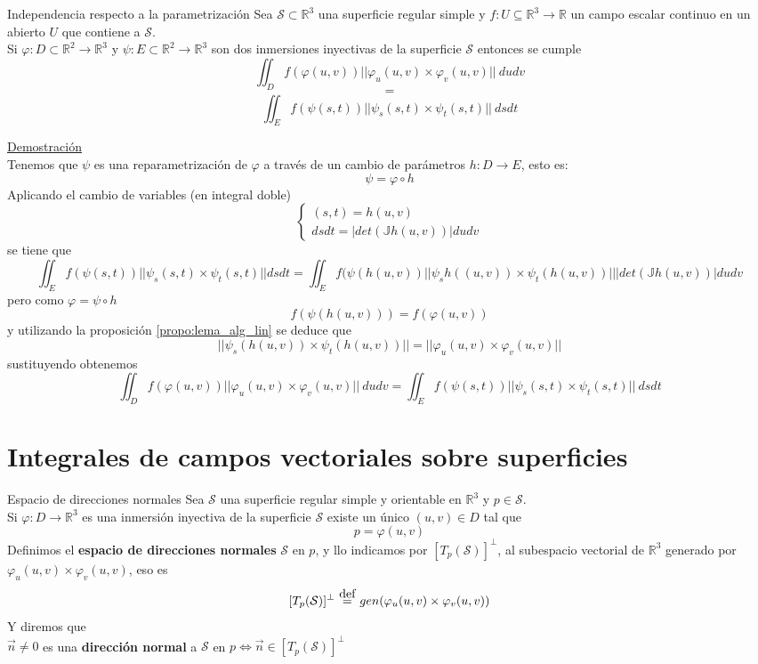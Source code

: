 \documentclass{report}
\newcommand\defeq{\stackrel{\mathclap{\normalfont\mbox{def}}}{~=~}}
\newcommand\reals{\mathds{R}}
\begin{document}
\begin{teobox}{Independencia respecto a la parametrización}
	Sea $\mathcal{S} \subset \reals^3$ una superficie regular simple y $f: U \subseteq \reals^3 \rightarrow \reals$ un campo escalar continuo en un abierto $U$ que contiene a $\mathcal{S}$. \\
	Si $\varphi : D \subset \reals^2 \rightarrow \reals^3$ y $\psi : E \subset \reals^2 \rightarrow \reals^3$ son dos inmersiones inyectivas de la superficie $\mathcal{S}$ entonces se cumple \\
	\[
		\iint_D{f(\varphi (u,v) ) ||\varphi_u (u,v) \times \varphi_v (u,v)||~dudv}
	\]
	\[ = \]
	\[
		\iint_E{f(\psi (s,t) ) ||\psi_s (s,t) \times \psi_t (s,t)||~dsdt}
	\]
\end{teobox}
\underline{Demostración} \\
Tenemos que $\psi$ es una reparametrización de $\varphi$ a través de un cambio de parámetros $h: D \rightarrow E$, esto es:
\[
	\psi = \varphi \circ h
\]
Aplicando el cambio de variables (en integral doble)
\[
	\left\{\begin{array}{l}
		(s,t) = h(u,v) \\
		dsdt = |det(\mathds{J}h(u,v))|dudv
	\end{array}\right.
\]
se tiene que \\
\[
	\iint_E{f(\psi (s,t) ) ||\psi_s (s,t) \times \psi_t (s,t)|| dsdt} =
	\iint_E{f(\psi (h(u,v)) ||\psi_s h((u,v)) \times \psi_t (h(u,v))|||det(\mathds{J}h(u,v))| dudv}
\]
pero como $\varphi = \psi \circ h$
\[
	f(\psi (h (u,v) ) ) = f(\varphi (u,v) )
\]
y utilizando la proposición \ref{propo:lema_alg_lin} se deduce que
\[
	||\psi_s (h(u,v)) \times \psi_t (h(u,v))|| = ||\varphi_u (u,v) \times \varphi_v (u,v)||
\]
sustituyendo obtenemos
\[
	\iint_D{f(\varphi (u,v) ) ||\varphi_u (u,v) \times \varphi_v (u,v)||~dudv} =
	\iint_E{f(\psi (s,t) ) ||\psi_s (s,t) \times \psi_t (s,t)||~dsdt}
\]
\section{Integrales de campos vectoriales sobre superficies}

\begin{defbox}{Espacio de direcciones normales}
	Sea $\mathcal{S}$ una superficie regular simple y orientable en $\reals^3$ y $p \in \mathcal{S}$.\\
	Si $\varphi : D \rightarrow \reals^3$ es una inmersión inyectiva de la superficie $\mathcal{S}$ existe un único $(u,v)\in D$ tal que
	\[
		p=\varphi (u,v)
	\]
	Definimos el \textbf{espacio de direcciones normales} $\mathcal{S}$ en $p$, y llo indicamos por $[T_p(\mathcal{S})]^\bot$, al subespacio vectorial de $\reals^3$ generado por $\varphi_u (u,v) \times \varphi_v (u,v)$, eso es
	\[
		[T_p(\mathcal{S})]^\bot \defeq gen(\varphi_u (u,v) \times \varphi_v (u,v))
	\]
	Y diremos que \\
	$\vec{n} \ne 0$ es una \textbf{dirección normal} a $\mathcal{S}$ en $p \iff \vec{n} \in [T_p(\mathcal{S})]^\bot$
\end{defbox}
\end{document}
